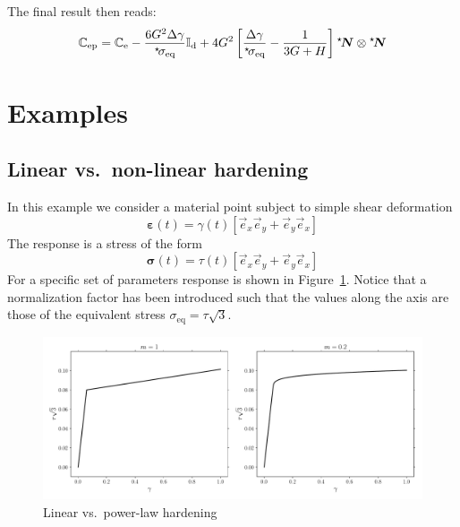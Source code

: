 \documentclass[times,namecite]{goose-article}
\newcommand\leftstar[1]{\hspace*{-.3em}~^\star\!#1}
\begin{document}
%
The final result then reads:
\begin{equation}
  \mathbb{C}_\mathrm{ep}
  =
  \mathbb{C}_\mathrm{e} -
  \frac{6 G^2 \Delta \gamma}{\leftstar{\sigma}_\mathrm{eq}}
  \mathbb{I}_\mathrm{d}
  + 4 G^2
  \left[
    \frac{\Delta \gamma}{\leftstar{\sigma}_\mathrm{eq}} -
    \frac{1}{3 G + H}
  \right]
  \leftstar{\bm{N}} \otimes \leftstar{\bm{N}}
\end{equation}

\vfill\newpage
\section{Examples}

\subsection{Linear vs.\ non-linear hardening}

In this example we consider a material point subject to simple shear deformation
\begin{equation}
  \bm{\varepsilon}(t) = \gamma(t) \left[ \vec{e}_x \vec{e}_y + \vec{e}_y \vec{e}_x \right]
\end{equation}
The response is a stress of the form
\begin{equation}
  \bm{\sigma}(t) = \tau(t) \left[ \vec{e}_x \vec{e}_y + \vec{e}_y \vec{e}_x \right]
\end{equation}
For a specific set of parameters response is shown in Figure~\ref{eq:powerlaw}. Notice that a  normalization factor has been introduced such that the values along the axis are those of the equivalent stress $\sigma_\mathrm{eq} = \tau \sqrt{3}$.

\begin{figure}[htp]
  \centering
  \includegraphics[width=1.\textwidth]{figures/parameters}
  \caption{Linear vs.\ power-law hardening}
  \label{eq:powerlaw}
\end{figure}
\end{document}

